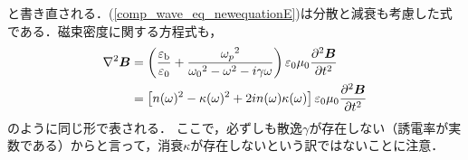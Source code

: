 と書き直される．(\ref{comp_wave_eq_newequationE})は分散と減衰も考慮した式である．磁束密度に関する方程式も，
\begin{align}
  \nabla^2\boldsymbol{B} &= \left(\dfrac{\varepsilon_{\text{b}}}{\varepsilon_0}+\dfrac{{\omega_p}^2}{{\omega_0}^2-\omega^2-i\gamma\omega}\right)\varepsilon_0\mu_0\dfrac{\partial^2\boldsymbol{B}}{\partial{t}^2}\notag\\
  &= \left[n(\omega)^2-\kappa(\omega)^2+2in(\omega)\kappa(\omega)\right]\varepsilon_0\mu_0\dfrac{\partial^2\boldsymbol{B}}{\partial{t}^2}\label{comp_wave_eq_newequationB}
\end{align}
のように同じ形で表される．
ここで，必ずしも散逸$\gamma$が存在しない（誘電率が実数である）からと言って，消衰$\kappa$が存在しないという訳ではないことに注意．
